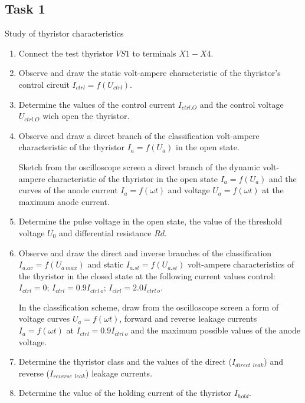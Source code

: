 \documentclass[a4paper,14pt]{article}
\begin{document}
\subsection{Task 1}

Study of thyristor characteristics

\begin{enumerate}
\item Connect the test thyristor $VS1$ to terminals $X1-X4$.
\item Observe and draw the static volt-ampere characteristic of the thyristor's control circuit 
$I_{ctrl} = f(U_{ctrl})$.
\item Determine the values of the control current $I_{ctrl.O}$ and the control voltage $U_{ctrl.O}$ wich open the thyristor.
\item Observe and draw a direct branch of the classification volt-ampere characteristic of the thyristor 
$I_a = f(U_a)$ in the open state.


Sketch from the oscilloscope screen a direct branch of the dynamic volt-ampere characteristic of the thyristor
in the open state $I_a=f(U_a)$ and the curves of the anode current $I_a=f(\omega t)$ 
and voltage $U_a = f(\omega t)$ at the maximum anode current.

\item Determine the pulse voltage in the open state, the value of the threshold voltage $U_0$
and differential resistance $Rd$.

\item Observe and draw the direct and inverse branches of the classification 
$I_{a.av} = f (U_{a\: max})$ and static $I_{a.st} = f (U_{a.st})$
volt-ampere characteristics of the thyristor in the closed state at the following current values
control: $I_{ctrl} = 0$; $I_{ctrl} = 0.9 I_{ctrl\:o}$; $I_{ctrl} = 2.0 I_{ctrl\:o}$.

In the classification scheme, draw from the oscilloscope screen
a form of voltage curves $U_a = f(\omega t)$, forward and reverse leakage currents $I_a = f(\omega t)$
at $I_{ctrl} = 0.9 I_{ctrl\:o}$ and the maximum possible values of the anode voltage.

\item Determine the thyristor class and the values of the direct ($I_{direct\:\:leak}$) and 
reverse ($I_{reverse\:\:leak}$) leakage currents.

\item Determine the value of the holding current of the thyristor $I_{hold}$.
\end{enumerate}
\end{document}
